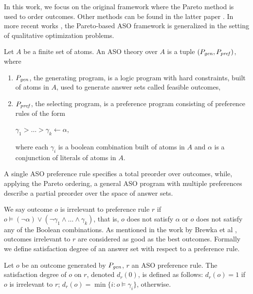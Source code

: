In this work, we focus on the original framework \cite{Brewka03answerset} where 
the Pareto method is used to order outcomes.
Other methods can be found in the latter paper \cite{Brewka04}.
In more recent works \cite{Faber:QOP,Faber:APF}, 
the Pareto-based ASO framework is generalized in the setting of
qualitative optimization problems.


\begin{definition}
	Let $A$ be a finite set of atoms.
	An ASO theory over $A$ is a tuple $(P_{\mathit{gen}},P_{\mathit{pref}})$, where
	\begin{enumerate} \itemsep -4pt
		\item $P_{\mathit{gen}}$, the generating program, is a logic program
					with hard constraints, built of atoms in $A$,
					used to generate answer sets called feasible outcomes,
		\item $P_{\mathit{pref}}$, the selecting program, is a preference
					program consisting of preference rules of the form
			\begin{center}
				$\gamma_1 > \ldots > \gamma_k \leftarrow \alpha$,
			\end{center}
					where each $\gamma_i$ is a boolean combination built
					of atoms in $A$ and $\alpha$ is a conjunction of
					literals of atoms in $A$.
	\end{enumerate}
\end{definition}


A single ASO preference rule specifies a total preorder over outcomes, while,
applying the Pareto ordering, a general ASO program with multiple preferences
describe a partial preorder over the space of answer sets.

We say outcome $o$ is irrelevant to preference rule $r$ if
$o \models (\neg \alpha) \vee (\neg \gamma_1 \wedge \ldots \wedge \gamma_k)$,
that is, $o$ does not satisfy $\alpha$ or $o$ does not satisfy any of
the Boolean combinations. As mentioned in the work by Brewka et al \cite{Brewka03answerset},
outcomes irrelevant to $r$ are considered as good as the
best outcomes.
Formally we define satisfaction degree of an answer set with respect to a
preference rule.
\begin{definition}
	Let $o$ be an outcome generated by $P_{\mathit{gen}}$,
	$r$ an ASO preference rule.
	The satisfaction degree of $o$ on $r$, denoted $d_r(0)$,
	is defined as follows: $d_r(o)=1$ if $o$ is irrelevant to $r$;
	$d_r(o)=\min\{i:o \models \gamma_i\}$, otherwise.
\end{definition}

